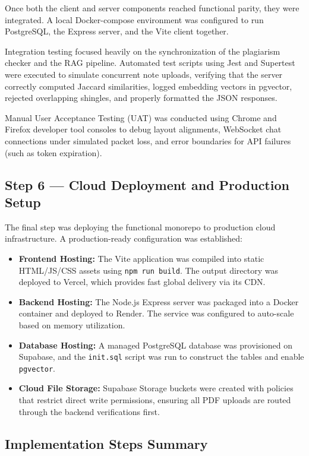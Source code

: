\documentclass[12,Times new Roman,a4paper]{report}
\begin{document}
Once both the client and server components reached functional parity, they were integrated. A local Docker-compose environment was configured to run PostgreSQL, the Express server, and the Vite client together.

Integration testing focused heavily on the synchronization of the plagiarism checker and the RAG pipeline. Automated test scripts using Jest and Supertest were executed to simulate concurrent note uploads, verifying that the server correctly computed Jaccard similarities, logged embedding vectors in pgvector, rejected overlapping shingles, and properly formatted the JSON responses.

Manual User Acceptance Testing (UAT) was conducted using Chrome and Firefox developer tool consoles to debug layout alignments, WebSocket chat connections under simulated packet loss, and error boundaries for API failures (such as token expiration).

\subsection{Step 6 — Cloud Deployment and Production Setup}

The final step was deploying the functional monorepo to production cloud infrastructure. A production-ready configuration was established:
\begin{itemize}
    \item \textbf{Frontend Hosting:} The Vite application was compiled into static HTML/JS/CSS assets using \texttt{npm run build}. The output directory was deployed to Vercel, which provides fast global delivery via its CDN.
    \item \textbf{Backend Hosting:} The Node.js Express server was packaged into a Docker container and deployed to Render. The service was configured to auto-scale based on memory utilization.
    \item \textbf{Database Hosting:} A managed PostgreSQL database was provisioned on Supabase, and the \texttt{init.sql} script was run to construct the tables and enable \texttt{pgvector}.
    \item \textbf{Cloud File Storage:} Supabase Storage buckets were created with policies that restrict direct write permissions, ensuring all PDF uploads are routed through the backend verifications first.
\end{itemize}

\subsection{Implementation Steps Summary}
\end{document}
